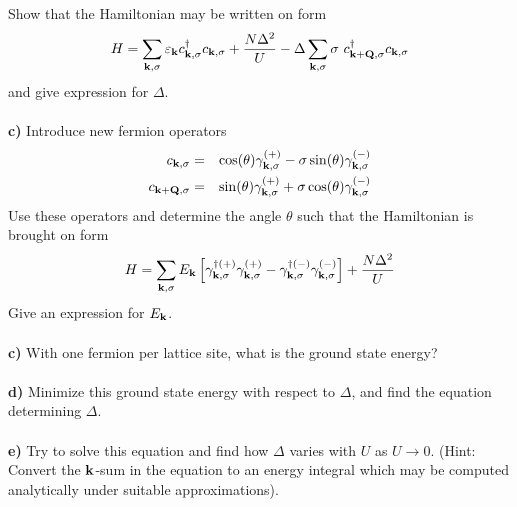 \begin{problem}
\ \\
\ \\
Show that the Hamiltonian may be written on form
\begin{eqnarray}
	H = \sum_{{\bf k},\sigma}  {\varepsilon_{{\bf k}}}  c^{\dagger}_{{\bf k},\sigma} c_{{\bf k},\sigma} + \frac{N \Delta^2}{U} 
	- \Delta \sum_{{\bf k},\sigma} \sigma  ~ c^{\dagger}_{{\bf k}+{\bf Q},\sigma} c_{{\bf k},\sigma}  \nonumber
\end{eqnarray} 
and give expression for $\Delta$.
\ \\
\ \\
{\bf c)} Introduce new fermion operators
\begin{eqnarray}
	c_{{\bf k},\sigma} & = & \cos(\theta) \gamma^{(+)}_{{\bf k},\sigma} - \sigma \sin(\theta) \gamma^{(-)}_{{\bf k},\sigma} \nonumber \\
	c_{{\bf k}+{\bf Q},\sigma} & = & \sin(\theta) \gamma^{(+)}_{{\bf k},\sigma} + \sigma \cos(\theta) \gamma^{(-)}_{{\bf k},\sigma} \nonumber 
\end{eqnarray}
Use these operators and determine the angle $\theta$ such that the Hamiltonian is brought on form
\begin{eqnarray}
	H = \sum_{{\bf k}, \sigma} E_{\bf k} \left[ \gamma^{\dagger (+)}_{{\bf k},\sigma}    \gamma^{(+)}_{{\bf k},\sigma}  
	-  \gamma^{\dagger (-)}_{{\bf k},\sigma}    \gamma^{(-)}_{{\bf k},\sigma}  \right] + \frac{N \Delta^2}{U} \nonumber
\end{eqnarray} 
Give an expression for $E_{\bf k}$.
\ \\
\ \\
{\bf c)} With one fermion per lattice site, what is the ground state energy? 
\ \\
\ \\
{\bf d)} Minimize this ground state energy with respect to $\Delta$, and find the equation determining $\Delta$.
\ \\
\ \\
{\bf e)} Try to solve this equation and find how $\Delta$ varies with $U$ as $U \to 0$. (Hint: Convert the ${\bf k}$-sum in the equation to an energy integral which may be computed analytically under suitable approximations).  
\ \\
\ \\
\end{problem}